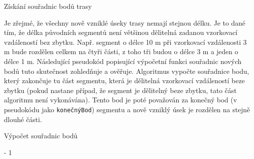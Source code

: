 \begin{algorithm}
\caption{Získání souřadnic bodů trasy}
\label{alg:getTrackVertices}
    \begin{algorithmic}[1]
    			\ELSE
    		\ENDIF
    	\ENDFOR
    \end{algorithmic}
\end{algorithm}

Je zřejmé, že všechny nově vzniklé úseky trasy nemají stejnou délku. Je to dané tím, že délka původních segmentů není většinou dělitelná zadanou vzorkovací vzdáleností bez zbytku. Např. segment o délce 10 m při vzorkovací vzdálenosti 3 m bude rozdělen celkem na čtyři části, z toho tři budou o délce 3 m a jeden o délce 1 m. Následující pseudokód popisující výpočetní funkci souřadnic nových bodů tuto skutečnost zohledňuje a ověřuje. Algoritmus vypočte souřadnice bodu, který zakončuje tu část segmentu, která je dělitelná vzorkovací vzdáleností beze zbytku (pokud nastane případ, že segment je dělitelný beze zbytku, tato část algoritmu není vykonávána). Tento bod je poté považován za konečný bod (v pseudokódu jako \texttt{konečnýBod}) segmentu a nově vzniklý úsek je rozdělen na stejně dlouhé části. 

\begin{algorithm}
\caption{Výpočet souřadnic bodů}
	\begin{algorithmic}[1]
		 - 1
			\ELSE
		\ENDIF
		\ENDFOR
		\ENDIF
	\end{algorithmic}
\end{algorithm}

